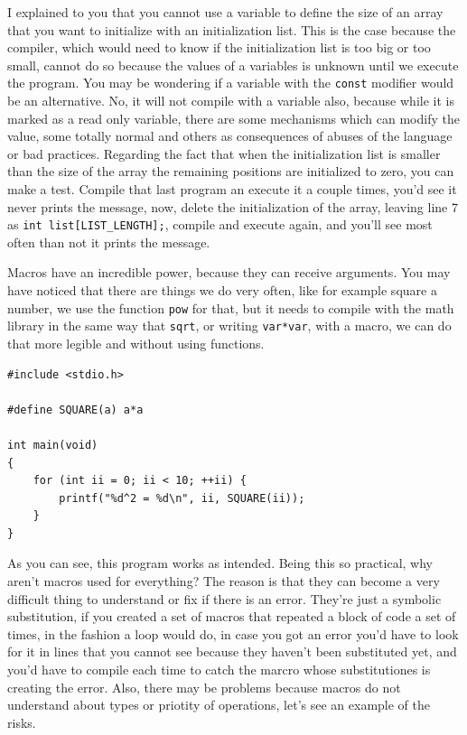 \documentclass[a4paper]{article}
\begin{document}
I explained to you that you cannot use a variable to define the size of an array
that you want to initialize with an initialization list. This is the case
because the compiler, which would need to know if the initialization list is too
big or too small, cannot do so because the values of a variables is unknown
until we execute the program. You may be wondering if a variable with the
\verb!const! modifier would be an alternative. No, it will not compile with a
variable also, because while it is marked as a read only variable, there are
some mechanisms which can modify the value, some totally normal and others as
consequences of abuses of the language or bad practices. Regarding the fact
that when the initialization list is smaller than the size of the array the
remaining positions are initialized to zero, you can make a test. Compile that
last program an execute it a couple times, you'd see it never prints the
message, now, delete the initialization of the array, leaving line 7 as
\verb!int list[LIST_LENGTH];!, compile and execute again, and you'll see most
often than not it prints the message.

Macros have an incredible power, because they can receive arguments. You may
have noticed that there are things we do very often, like for example square a
number, we use the function \verb!pow! for that, but it needs to compile with
the math library in the same way that \verb!sqrt!, or writing \verb!var*var!,
with a macro, we can do that more legible and without using functions.

\noindent
\begin{minipage}[H]{\linewidth}
\mbox{}
\begin{lstlisting}[style=C,
caption={Macro with arguments},
label={lst:macroWithArguments}]
#include <stdio.h>

#define SQUARE(a) a*a

int main(void)
{
    for (int ii = 0; ii < 10; ++ii) {
        printf("%d^2 = %d\n", ii, SQUARE(ii));
    }
}
\end{lstlisting}
\end{minipage}

As you can see, this program works as intended. Being this so practical, why
aren't macros used for everything? The reason is that they can become a very
difficult thing to understand or fix if there is an error. They're just a
symbolic substitution, if you created a set of macros that repeated a block of
code a set of times, in the fashion a loop would do, in case you got an error
you'd have to look for it in lines that you cannot see because they haven't been
substituted yet, and you'd have to compile each time to catch the marcro whose
substitutiones is creating the error. Also, there may be problems because macros
do not understand about types or priotity of operations, let's see an example of
the risks.
\end{document}
